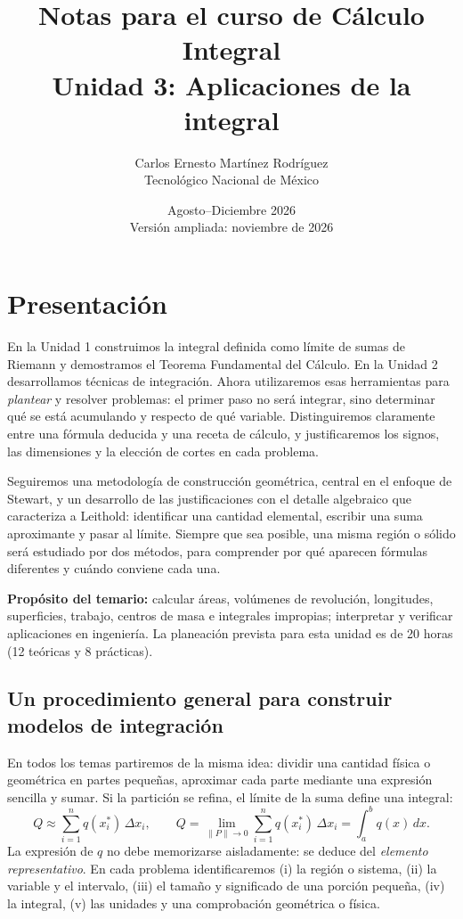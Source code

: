 \documentclass[12pt]{article}
\title{\textbf{Notas para el curso de Cálculo Integral}\\[0.3cm]\Large Unidad 3: Aplicaciones de la integral}
\author{Carlos Ernesto Martínez Rodríguez\\Tecnológico Nacional de México}
\date{Agosto--Diciembre 2026\\Versión ampliada: noviembre de 2026}
\theoremstyle{definition}
\theoremstyle{remark}
\begin{document}
\maketitle
\tableofcontents
\newpage
\section*{Presentación}
En la Unidad 1 construimos la integral definida como límite de sumas de Riemann y demostramos el Teorema Fundamental del Cálculo. En la Unidad 2 desarrollamos técnicas de integración. Ahora utilizaremos esas herramientas para \emph{plantear} y resolver problemas: el primer paso no será integrar, sino determinar qué se está acumulando y respecto de qué variable. Distinguiremos claramente entre una fórmula deducida y una receta de cálculo, y justificaremos los signos, las dimensiones y la elección de cortes en cada problema.

Seguiremos una metodología de construcción geométrica, central en el enfoque de Stewart, y un desarrollo de las justificaciones con el detalle algebraico que caracteriza a Leithold: identificar una cantidad elemental, escribir una suma aproximante y pasar al límite. Siempre que sea posible, una misma región o sólido será estudiado por dos métodos, para comprender por qué aparecen fórmulas diferentes y cuándo conviene cada una.

\textbf{Propósito del temario:} calcular áreas, volúmenes de revolución, longitudes, superficies, trabajo, centros de masa e integrales impropias; interpretar y verificar aplicaciones en ingeniería. La planeación prevista para esta unidad es de 20 horas (12 teóricas y 8 prácticas).


\subsection*{Un procedimiento general para construir modelos de integración}
En todos los temas partiremos de la misma idea: dividir una cantidad física o geométrica en partes pequeñas, aproximar cada parte mediante una expresión sencilla y sumar. Si la partición se refina, el límite de la suma define una integral:
\[
Q\approx\sum_{i=1}^n q(x_i^*)\,\Delta x_i,
\qquad Q=\lim_{\|P\|\to0}\sum_{i=1}^n q(x_i^*)\,\Delta x_i
=\int_a^b q(x)\,dx.
\]
La expresión de $q$ no debe memorizarse aisladamente: se deduce del \emph{elemento representativo}. En cada problema identificaremos (i) la región o sistema, (ii) la variable y el intervalo, (iii) el tamaño y significado de una porción pequeña, (iv) la integral, (v) las unidades y una comprobación geométrica o física.
\end{document}
